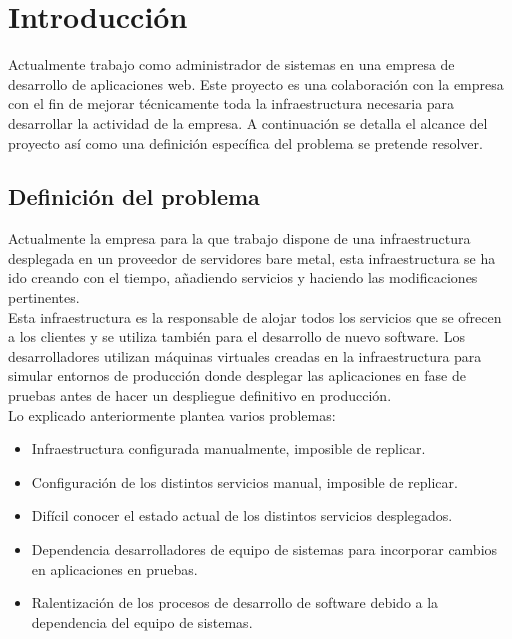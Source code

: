 \chapter {Introducción}
	\begin{paragraph}
		Actualmente trabajo como administrador de sistemas en una empresa de desarrollo de aplicaciones web. Este proyecto es una colaboración con la empresa con el fin de mejorar técnicamente toda la infraestructura necesaria para desarrollar la actividad de la empresa. A continuación se detalla el alcance del proyecto así como una definición específica del problema se pretende resolver.
	\end{paragraph}
\section{Definición del problema}
	\begin{text}
		Actualmente la empresa para la que trabajo dispone de una infraestructura desplegada en un proveedor de servidores bare metal, esta infraestructura se ha ido creando con el tiempo, añadiendo servicios y haciendo las modificaciones pertinentes. \\
		Esta infraestructura es la responsable de alojar todos los servicios que se ofrecen a los clientes y se utiliza también para el desarrollo de nuevo software. Los desarrolladores utilizan máquinas virtuales creadas en la infraestructura para simular entornos de producción donde desplegar las aplicaciones en fase de pruebas antes de hacer un despliegue definitivo en producción. \\
		Lo explicado anteriormente plantea varios problemas:
		\begin{itemize}
			\item Infraestructura configurada manualmente, imposible de replicar.
			\item Configuración de los distintos servicios manual, imposible de replicar. 
			\item Difícil conocer el estado actual de los distintos servicios desplegados. 
			\item Dependencia desarrolladores de equipo de sistemas para incorporar cambios en aplicaciones en pruebas.
			\item Ralentización de los procesos de desarrollo de software debido a la dependencia del equipo de sistemas.
		\end{itemize}
	\end{text}

